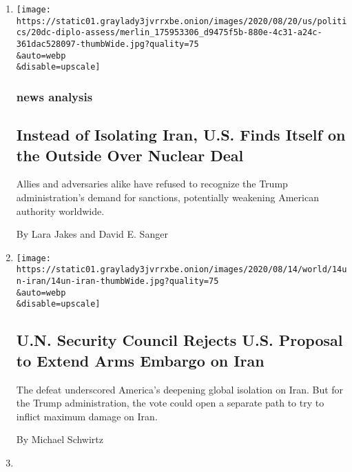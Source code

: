 \begin{enumerate}
\def\labelenumi{\arabic{enumi}.}
\item
  \href{/2020/08/20/us/politics/trump-iran-nuclear-deal.html}{}

  \texttt{[image: https://static01.graylady3jvrrxbe.onion/images/2020/08/20/us/politics/20dc-diplo-assess/merlin\_175953306\_d9475f5b-880e-4c31-a24c-361dac528097-thumbWide.jpg?quality=75\\\&auto=webp\\\&disable=upscale]}

  \hypertarget{news-analysis}{%
  \subsubsection{news analysis}\label{news-analysis}}

  \hypertarget{instead-of-isolating-iran-us-finds-itself-on-the-outside-over-nuclear-deal}{%
  \subsection{Instead of Isolating Iran, U.S. Finds Itself on the
  Outside Over Nuclear
  Deal}\label{instead-of-isolating-iran-us-finds-itself-on-the-outside-over-nuclear-deal}}

  Allies and adversaries alike have refused to recognize the Trump
  administration's demand for sanctions, potentially weakening American
  authority worldwide.

  By Lara Jakes and David E. Sanger
\item
  \href{/2020/08/14/world/middleeast/UN-Iran-embargo.html}{}

  \texttt{[image: https://static01.graylady3jvrrxbe.onion/images/2020/08/14/world/14un-iran/14un-iran-thumbWide.jpg?quality=75\\\&auto=webp\\\&disable=upscale]}

  \hypertarget{un-security-council-rejects-us-proposal-to-extend-arms-embargo-on-iran}{%
  \subsection{U.N. Security Council Rejects U.S. Proposal to Extend Arms
  Embargo on
  Iran}\label{un-security-council-rejects-us-proposal-to-extend-arms-embargo-on-iran}}

  The defeat underscored America's deepening global isolation on Iran.
  But for the Trump administration, the vote could open a separate path
  to try to inflict maximum damage on Iran.

  By Michael Schwirtz
\item
  \href{/2020/08/13/us/politics/russian-bounties-pompeo.html}{}


\end{enumerate}
